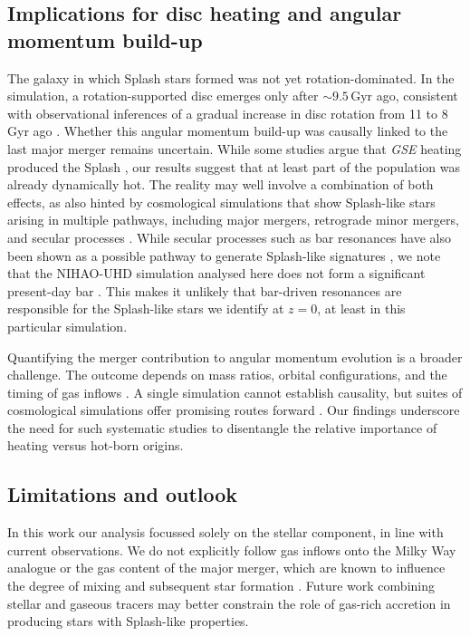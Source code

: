 \documentclass[fleqn,usenatbib]{mnras}
\begin{document}
\subsection{Implications for disc heating and angular momentum build-up}

The galaxy in which Splash stars formed was not yet rotation-dominated. In the simulation, a rotation-supported disc emerges only after $\sim 9.5\,\mathrm{Gyr}$ ago, consistent with observational inferences of a gradual increase in disc rotation from 11 to 8 Gyr ago \citep[e.g.][]{MCM2013}. Whether this angular momentum build-up was causally linked to the last major merger remains uncertain. While some studies argue that \textit{GSE} heating produced the Splash \citep{Bonaca2020, DiMatteo2019}, our results suggest that at least part of the population was already dynamically hot. The reality may well involve a combination of both effects, as also hinted by cosmological simulations that show Splash-like stars arising in multiple pathways, including major mergers, retrograde minor mergers, and secular processes \citep{Dillamore2022, Dillamore2023, Dillamore2025, Kisku2025}. While secular processes such as bar resonances have also been shown as a possible pathway to generate Splash-like signatures \citep{Dillamore2022,Dillamore2023}, we note that the NIHAO-UHD simulation analysed here does not form a significant present-day bar \citep{Buder2025}. This makes it unlikely that bar-driven resonances are responsible for the Splash-like stars we identify at $z=0$, at least in this particular simulation.

Quantifying the merger contribution to angular momentum evolution is a broader challenge. The outcome depends on mass ratios, orbital configurations, and the timing of gas inflows \citep[e.g.][]{Lagos2017, Lagos2018}. A single simulation cannot establish causality, but suites of cosmological simulations offer promising routes forward \citep{Pillepich2019, SotilloRamos2022}. Our findings underscore the need for such systematic studies to disentangle the relative importance of heating versus hot-born origins.

\subsection{Limitations and outlook}

In this work our analysis focussed solely on the stellar component, in line with current observations. We do not explicitly follow gas inflows onto the Milky Way analogue or the gas content of the major merger, which are known to influence the degree of mixing and subsequent star formation \citep{Agertz2021, Renaud2021b, Buck2023}. Future work combining stellar and gaseous tracers may better constrain the role of gas-rich accretion in producing stars with Splash-like properties.
\end{document}
